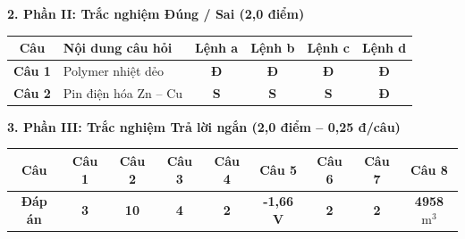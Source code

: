 \documentclass[11pt,a4paper]{article}
\begin{document}
\vspace{2pt}
\noindent
\textbf{\color{mainGreen}2. Phần II: Trắc nghiệm Đúng / Sai (2,0 điểm)}
\begin{center}
\renewcommand{\arraystretch}{1.2}
\begin{tabular}{|c|p{7.5cm}|c|c|c|c|}
\hline
\rowcolor{tableGreen}
\textbf{Câu} & \textbf{Nội dung câu hỏi} & \textbf{Lệnh a} & \textbf{Lệnh b} & \textbf{Lệnh c} & \textbf{Lệnh d} \\
\hline
\textbf{Câu 1} & Polymer nhiệt dẻo & \textbf{\color{hfRed}Đ} & \textbf{\color{hfRed}Đ} & \textbf{\color{hfRed}Đ} & \textbf{\color{hfRed}Đ} \\
\hline
\textbf{Câu 2} & Pin điện hóa Zn -- Cu & \textbf{\color{gray}S} & \textbf{\color{gray}S} & \textbf{\color{gray}S} & \textbf{\color{hfRed}Đ} \\
\hline
\end{tabular}
\end{center}

\vspace{2pt}
\noindent
\textbf{\color{mainGreen}3. Phần III: Trắc nghiệm Trả lời ngắn (2,0 điểm -- 0,25 đ/câu)}
\begin{center}
\renewcommand{\arraystretch}{1.2}
\begin{tabular}{|c|c|c|c|c|c|c|c|c|}
\hline
\rowcolor{tableGreen}
\textbf{Câu} & \textbf{Câu 1} & \textbf{Câu 2} & \textbf{Câu 3} & \textbf{Câu 4} & \textbf{Câu 5} & \textbf{Câu 6} & \textbf{Câu 7} & \textbf{Câu 8} \\
\hline
\textbf{Đáp án} & \textbf{\color{hfRed}3} & \textbf{\color{hfRed}10} & \textbf{\color{hfRed}4} & \textbf{\color{hfRed}2} & \textbf{\color{hfRed}-1,66 V} & \textbf{\color{hfRed}2} & \textbf{\color{hfRed}2} & \textbf{\color{hfRed}4958 $\text{m}^3$} \\
\hline
\end{tabular}
\end{center}
\end{document}
